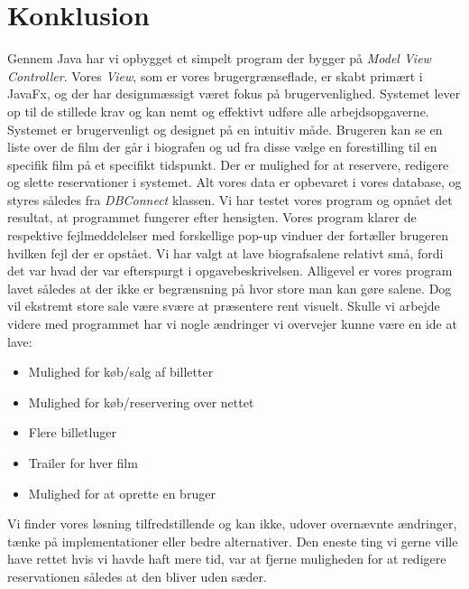 \documentclass[final]{report}
\begin{document}
\chapter{Konklusion}
Gennem Java har vi opbygget et simpelt program der bygger på \emph{Model View Controller}. Vores \emph{View}, som er vores brugergrænseflade, er skabt primært i JavaFx, og der har designmæssigt været fokus på brugervenlighed. 
Systemet lever op til de stillede krav og kan nemt og effektivt udføre alle arbejdsopgaverne. Systemet er brugervenligt og designet på en intuitiv måde. Brugeren kan se en liste over de film der går i biografen og ud fra disse vælge en forestilling til en specifik film på et specifikt tidspunkt. Der er mulighed for at reservere, redigere og slette reservationer i systemet. Alt vores data er opbevaret i vores database, og styres således fra \emph{DBConnect} klassen. Vi har testet vores program og opnået det resultat, at programmet fungerer efter hensigten. Vores program klarer de respektive fejlmeddelelser med forskellige pop-up vinduer der fortæller brugeren hvilken fejl der er opstået. Vi har valgt at lave biografsalene relativt små, fordi det var hvad der var efterspurgt i opgavebeskrivelsen. Alligevel er vores program lavet således at der ikke er begrænsning på hvor store man kan gøre salene. Dog vil ekstremt store sale være svære at præsentere rent visuelt. Skulle vi arbejde videre med programmet har vi nogle ændringer vi overvejer kunne være en ide at lave:

\begin{itemize}
\item Mulighed for køb/salg af billetter
\item Mulighed for køb/reservering over nettet
\item Flere billetluger
\item Trailer for hver film
\item Mulighed for at oprette en bruger
\end{itemize}

Vi finder vores løsning tilfredstillende og kan ikke, udover overnævnte ændringer, tænke på implementationer eller bedre alternativer. Den eneste ting vi gerne ville have rettet hvis vi havde haft mere tid, var at fjerne muligheden for at redigere reservationen således at den bliver uden sæder. 

\printbibliography

\listoffigures
\end{document}
